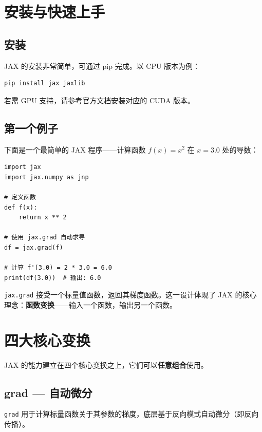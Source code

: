 \documentclass[12pt,a4paper]{article}
\begin{document}
\section{安装与快速上手}

\subsection{安装}

JAX 的安装非常简单，可通过 pip 完成。以 CPU 版本为例：

\begin{lstlisting}
pip install jax jaxlib
\end{lstlisting}

若需 GPU 支持，请参考官方文档安装对应的 CUDA 版本。

\subsection{第一个例子}

下面是一个最简单的 JAX 程序——计算函数 $f(x) = x^2$ 在 $x=3.0$ 处的导数：

\begin{lstlisting}
import jax
import jax.numpy as jnp

# 定义函数
def f(x):
    return x ** 2

# 使用 jax.grad 自动求导
df = jax.grad(f)

# 计算 f'(3.0) = 2 * 3.0 = 6.0
print(df(3.0))  # 输出: 6.0
\end{lstlisting}

\texttt{jax.grad} 接受一个标量值函数，返回其梯度函数。这一设计体现了 JAX 的核心理念：\textbf{函数变换}——输入一个函数，输出另一个函数。

\section{四大核心变换}

JAX 的能力建立在四个核心变换之上，它们可以\textbf{任意组合}使用。

\subsection{grad --- 自动微分}

\texttt{grad} 用于计算标量函数关于其参数的梯度，底层基于反向模式自动微分（即反向传播）。
\end{document}
